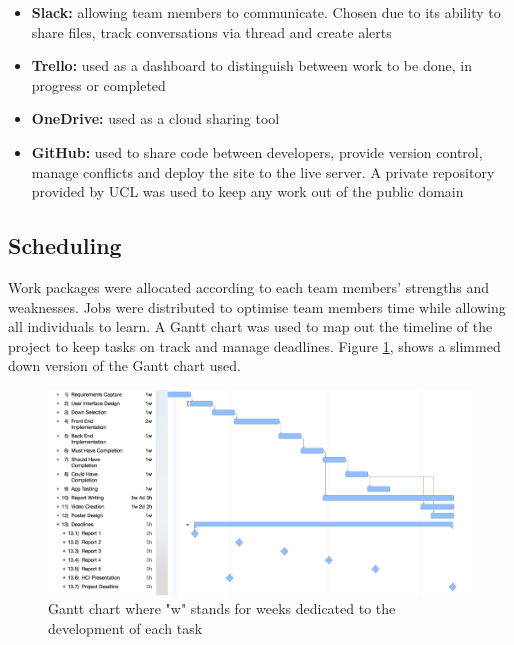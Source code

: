 \documentclass[fontsize=10pt]{extarticle}
\numberwithin{figure}{section} %
\providecommand{\tightlist}{%
  \setlength{\itemsep}{0pt}\setlength{\parskip}{0pt}}
\begin{document}
\begin{itemize}
\tightlist
\item
  \textbf{Slack:} allowing team members to communicate. Chosen due to
  its ability to share files, track conversations via thread and create
  alerts
\item
  \textbf{Trello:} used as a dashboard to distinguish between work to be
  done, in progress or completed
\item
  \textbf{OneDrive:} used as a cloud sharing tool
\item
  \textbf{GitHub:} used to share code between developers, provide
  version control, manage conflicts and deploy the site to the live
  server. A private repository provided by UCL was used to keep any work
  out of the public domain
\end{itemize}

\hypertarget{scheduling}{%
\subsection{Scheduling}\label{scheduling}}

Work packages were allocated according to each team members' strengths
and weaknesses. Jobs were distributed to optimise team members time
while allowing all individuals to learn. A Gantt chart was used to map
out the timeline of the project to keep tasks on track and manage
deadlines. Figure \ref{gantt}, shows a slimmed down version of the Gantt
chart used.

\begin{landscape}
\begin{figure}[H]
      \centering
      \includegraphics[trim = 0 0 0 0, clip, width=1.3\textwidth]{Picture1.png}
      \caption{Gantt chart where "w" stands for weeks dedicated to the development of each task}
\label{gantt}
 \end{figure}
 \end{landscape}
\end{document}
